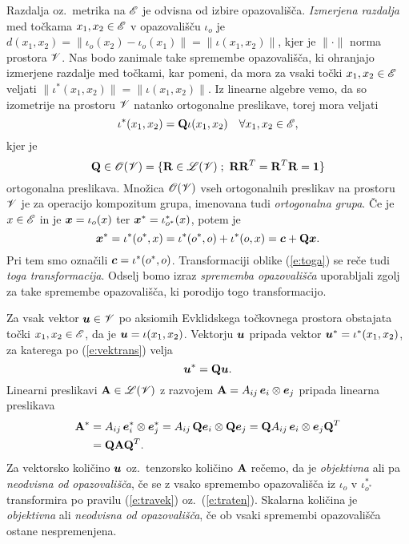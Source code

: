 Razdalja oz.~metrika na $\mathscr E$ je odvisna od izbire opazovališča. \emph{Izmerjena razdalja} med točkama
$x_1,x_2\in\mathscr E$ v opazovališču $\iota_o$ je
$d(x_1,x_2)=\|\iota_o(x_2)-\iota_o(x_1)\|=\|\iota(x_1,x_2)\|$,
kjer je $\|\cdot\|$ norma prostora $\mathscr V$. Nas bodo zanimale take
spremembe opazovališča, ki ohranjajo izmerjene razdalje med točkami, kar pomeni,
da mora za vsaki točki $x_1,x_2\in\mathscr E$ veljati
$\|\iota^*(x_1,x_2)\|=\|\iota(x_1,x_2)\|$.
Iz linearne algebre vemo, da so izometrije na prostoru $\mathscr V$ natanko ortogonalne preslikave,
torej mora veljati
\begin{equation} \label{e:vektrans}
	\iota^*(x_1,x_2)=\mathbf Q\iota(x_1,x_2)\quad\forall x_1,x_2\in\mathscr E,
\end{equation}
kjer je
\[
	\ten{Q}\in\mathscr{O}(\V)=\{\ten{R}\in\L(\V)\;;\ \ten{R}\ten{R}^T=\ten{R}^T\ten{R}=\ten{1}\}
\]
ortogonalna preslikava. Množica $\mathscr{O}(\mathscr V)$ vseh ortogonalnih preslikav na prostoru
$\mathscr V$ je za operacijo kompozitum grupa, imenovana tudi \emph{ortogonalna grupa}. Če je $x\in\mathscr E$ in
je $\boldsymbol x=\iota_o(x)$ ter $\boldsymbol x^*=\iota^*_{o^*}(x)$, potem je
\begin{equation} \label{e:toga}
	\boldsymbol x^*=\iota^*(o^*,x)=\iota^*(o^*,o)+\iota^*(o,x)=\boldsymbol c+\mathbf Q\boldsymbol x.
\end{equation}
Pri tem smo označili $\boldsymbol c=\iota^*(o^*,o)$. Transformaciji oblike (\ref{e:toga})
se reče tudi \emph{toga transformacija}. Odselj bomo izraz \textit{sprememba opazovališča}
uporabljali zgolj za take spremembe opazovališča, ki porodijo togo transformacijo.

Za vsak vektor $\boldsymbol u\in\mathscr V$ po aksiomih Evklidskega točkovnega prostora obstajata
točki $x_1,x_2\in\mathscr E$, da je $\boldsymbol u=\iota(x_1,x_2)$. Vektorju $\boldsymbol u$ pripada
vektor $\boldsymbol u^*=\iota^*(x_1,x_2)$, za katerega po (\ref{e:vektrans}) velja
\begin{equation} \label{e:travek}
	\boldsymbol u^*=\mathbf Q\boldsymbol u.
\end{equation}
Linearni preslikavi $\mathbf A\in\mathscr L(\mathscr V)$ z razvojem $\mathbf A=A_{ij}\,\boldsymbol e_i\otimes\boldsymbol e_j$
pripada linearna preslikava
\begin{align}
	\mathbf A^*&=A_{ij}\,\boldsymbol e^*_i\otimes\boldsymbol e^*_j=A_{ij}\,\mathbf Q\boldsymbol e_i\otimes\mathbf Q\boldsymbol e_j
	=\mathbf QA_{ij}\,\boldsymbol e_i\otimes\boldsymbol e_j\mathbf Q^T \nonumber \\
	&=\mathbf Q\mathbf A\mathbf Q^T. \label{e:traten}
\end{align}
Za vektorsko količino $\boldsymbol u$ oz.~tenzorsko količino $\mathbf A$
rečemo, da je \emph{objektivna} ali pa \emph{neodvisna od opazovališča},
če se z vsako spremembo opazovališča iz $\iota_o$ v $\iota^*_{o^*}$
transformira po pravilu (\ref{e:travek}) oz.~(\ref{e:traten}).
Skalarna količina je \emph{objektivna} ali \emph{neodvisna od opazovališča},
če ob vsaki spremembi opazovališča ostane nespremenjena.

